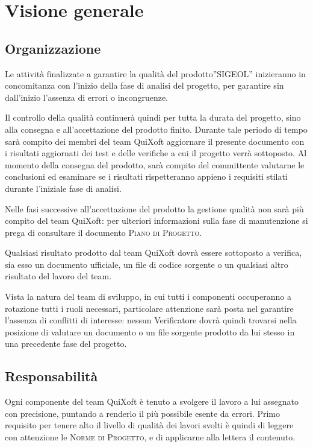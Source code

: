 \documentclass[11pt,a4paper]{article}
\begin{document}
\section{Visione generale}
\subsection{Organizzazione} 
Le attività finalizzate a garantire la qualità del prodotto''SIGEOL'' inizieranno in concomitanza con l'inizio della fase di analisi del progetto, per garantire sin dall'inizio l'assenza di errori o incongruenze.

Il controllo della qualità continuerà quindi per tutta la durata del progetto, sino alla consegna e all'accettazione del prodotto finito. Durante tale periodo di tempo sarà compito dei membri del team QuiXoft aggiornare il presente documento con i risultati aggiornati dei test e delle verifiche a cui il progetto verrà sottoposto. Al momento della consegna del prodotto, sarà compito del committente valutarne le conclusioni ed esaminare se i risultati rispetteranno appieno i requisiti stilati durante l'iniziale fase di analisi.

Nelle fasi successive all'accettazione del prodotto la gestione qualità non sarà più compito del team QuiXoft: per ulteriori informazioni sulla fase di manutenzione si prega di consultare il documento \textsc{Piano di Progetto}.

Qualsiasi risultato prodotto dal team QuiXoft dovrà essere sottoposto a verifica, sia esso un documento ufficiale, un file di codice sorgente o un qualsiasi altro risultato del lavoro del team.

Vista la natura del team di sviluppo, in cui tutti i componenti occuperanno a rotazione tutti i ruoli necessari, particolare attenzione sarà posta nel garantire l'assenza di conflitti di interesse: nessun Verificatore dovrà quindi trovarsi nella posizione di valutare un documento o un file sorgente prodotto da lui stesso in una precedente fase del progetto.	
\subsection{Responsabilità}
Ogni componente del team QuiXoft è tenuto a svolgere il lavoro a lui assegnato con precisione, puntando a renderlo il più possibile esente da errori.
Primo requisito per tenere alto il livello di qualità dei lavori svolti è quindi di leggere con attenzione le \textsc{Norme di Progetto}, e di applicarne alla lettera il contenuto.
\end{document}
